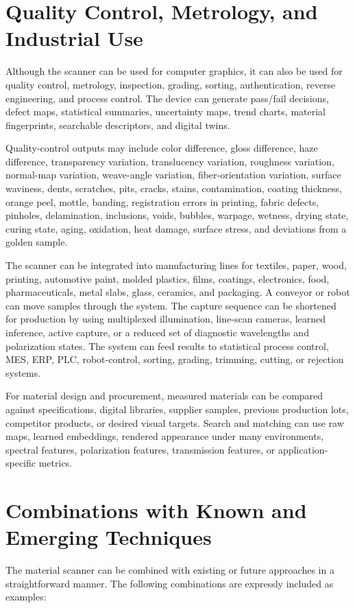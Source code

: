 \documentclass[11pt, twoside, listof=totocnumbered, bibliography=totocnumbered]{scrartcl}
\begin{document}
	\section{Quality Control, Metrology, and Industrial Use}
	Although the scanner can be used for computer graphics, it can also be used for quality control, metrology, inspection, grading, sorting, authentication, reverse engineering, and process control. The device can generate pass/fail decisions, defect maps, statistical summaries, uncertainty maps, trend charts, material fingerprints, searchable descriptors, and digital twins.
	
	Quality-control outputs may include color difference, gloss difference, haze difference, transparency variation, translucency variation, roughness variation, normal-map variation, weave-angle variation, fiber-orientation variation, surface waviness, dents, scratches, pits, cracks, stains, contamination, coating thickness, orange peel, mottle, banding, registration errors in printing, fabric defects, pinholes, delamination, inclusions, voids, bubbles, warpage, wetness, drying state, curing state, aging, oxidation, heat damage, surface stress, and deviations from a golden sample.
	
	The scanner can be integrated into manufacturing lines for textiles, paper, wood, printing, automotive paint, molded plastics, films, coatings, electronics, food, pharmaceuticals, metal slabs, glass, ceramics, and packaging. A conveyor or robot can move samples through the system. The capture sequence can be shortened for production by using multiplexed illumination, line-scan cameras, learned inference, active capture, or a reduced set of diagnostic wavelengths and polarization states. The system can feed results to statistical process control, MES, ERP, PLC, robot-control, sorting, grading, trimming, cutting, or rejection systems.
	
	For material design and procurement, measured materials can be compared against specifications, digital libraries, supplier samples, previous production lots, competitor products, or desired visual targets. Search and matching can use raw maps, learned embeddings, rendered appearance under many environments, spectral features, polarization features, transmission features, or application-specific metrics.
	
	\section{Combinations with Known and Emerging Techniques}
	The material scanner can be combined with existing or future approaches in a straightforward manner. The following combinations are expressly included as examples:
	
\end{document}
